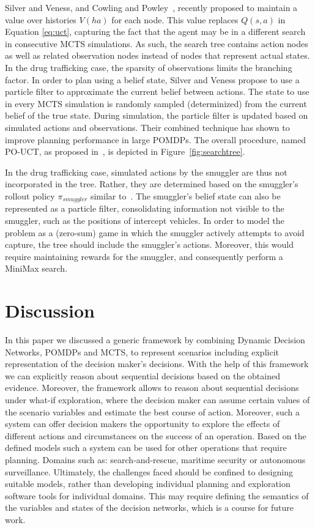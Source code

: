 \documentclass[conference]{IEEEtran}
\begin{document}
Silver and Veness, and Cowling and Powley~\cite{silver2010monte,cowling2012information}, recently proposed to maintain a value over histories $V(ha)$ for each node. This value replaces $Q(s,a)$ in Equation \ref{eq:uct}, capturing the fact that the agent may be in a different search in consecutive MCTS simulations. As such, the search tree contains action nodes as well as related observation nodes instead of nodes that represent actual states. In the drug trafficking case, the sparsity of observations limits the branching factor. In order to plan using a belief state, Silver and Veness propose to use a particle filter to approximate the current belief between actions. The state to use in every MCTS simulation is randomly sampled (\ie determinized) from the current belief of the true state. During simulation, the particle filter is updated based on simulated actions and observations. Their combined technique has shown to improve planning performance in large POMDPs. The overall procedure, named PO-UCT, as proposed in~\cite{silver2010monte}, is depicted in Figure~\ref{fig:searchtree}. 

In the drug trafficking case, simulated actions by the smuggler are thus not incorporated in the tree. Rather, they are determined based on the smuggler's rollout policy $\pi_{smuggler}$ similar to~\cite{realtime2014}. The smuggler's belief state can also be represented as a particle filter, consolidating information not visible to the smuggler, such as the positions of intercept vehicles. In order to model the problem as a (zero-sum) game in which the smuggler actively attempts to avoid capture, the tree should include the smuggler's actions. Moreover, this would require maintaining rewards for the smuggler, and consequently perform a MiniMax search.

\section{Discussion}
\label{sec:discussion}

In this paper we discussed a generic framework by combining Dynamic Decision Networks, POMDPs and MCTS, to represent scenarios including explicit representation of the decision maker's decisions. With the help of this framework we can explicitly reason about sequential decisions based on the obtained evidence. Moreover, the framework allows to reason about sequential decisions under what-if exploration, where the decision maker can assume certain values of the scenario variables and estimate the best course of action. Moreover, such a system can offer decision makers the opportunity to explore the effects of different actions and circumstances on the success of an operation. Based on the defined models such a system can be used for other operations that require planning. Domains such as: search-and-rescue, maritime security or autonomous surveillance. Ultimately, the challenges faced should be confined to designing suitable models, rather than developing individual planning and exploration software tools for individual domains. This may require defining the semantics of the variables and states of the decision networks, which is a course for future work.
\end{document}

